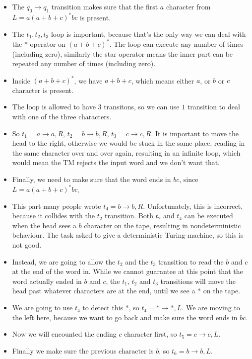 \begin{itemize}
    \item The $q_0 \rightarrow q_1$ transition makes sure that the first $a$ character from $L=a(a+b+c)^*bc$ is present.
    \item The $t_1, t_2, t_3$ loop is important, because that's the only way we can deal with the $*$ operator on $(a+b+c)^*$. The loop can execute any number of times (including zero), similarly the star operator means the inner part can be repeated any number of times (including zero).
    \item Inside $(a+b+c)^*$, we have $a+b+c$, which means either $a$, or $b$ or $c$ character is present.
    \item The loop is allowed to have $3$ transitons, so we can use $1$ transition to deal with one of the three characters.
    \item So $t_1 = a \rightarrow a, R$, $t_2 = b \rightarrow b, R$, $t_3 = c \rightarrow c, R$. It is important to move the head to the right, otherwise we would be stuck in the same place, reading in the same character over and over again, resulting in an infinite loop, which would mean the TM rejects the input word and we don't want that.
    \item Finally, we need to make sure that the word ends in $bc$, since $L=a(a+b+c)^*bc$.
    \item This part many people wrote $t_4 = b \rightarrow b, R$. Unfortunately, this is incorrect, because it collides with the $t_2$ transition. Both $t_2$ and $t_4$ can be executed when the head sees a $b$ character on the tape, resulting in nondeterministic behaviour. The task asked to give a deterministic Turing-machine, so this is not good.
    \item Instead, we are going to allow the $t_2$ and the $t_3$ transition to read the $b$ and $c$ at the end of the word in. While we cannot guarantee at this point that the word actually ended in $b$ and $c$, the $t_1$, $t_2$ and $t_3$ transitions will move the head past whatever characters are at the end, until we see a $*$ on the tape.
    \item We are going to use $t_4$ to detect this $*$, so $t_4 = * \rightarrow *, L$. We are moving to the left here, because we want to go back and make sure the word ends in $bc$.
    \item Now we will encounted the ending $c$ character first, so $t_5 = c \rightarrow c, L$.
    \item Finally we make sure the previous character is $b$, so $t_6 = b \rightarrow b, L$.
\end{itemize}

